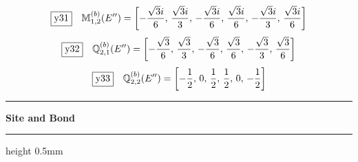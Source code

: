 \documentclass[fleqn,10pt,landscape]{jsarticle}
\begin{document}
\begin{dmath*}
\fbox{y31}\quad \mathbb{M}_{1,2}^{(b)}(E^{\prime\prime})=\left[ - \frac{\sqrt{3} i}{6},\, \frac{\sqrt{3} i}{3},\, - \frac{\sqrt{3} i}{6},\, \frac{\sqrt{3} i}{6},\, - \frac{\sqrt{3} i}{3},\, \frac{\sqrt{3} i}{6} \right]
\end{dmath*}
\begin{dmath*}
\fbox{y32}\quad \mathbb{Q}_{2,1}^{(b)}(E^{\prime\prime})=\left[ - \frac{\sqrt{3}}{6},\, \frac{\sqrt{3}}{3},\, - \frac{\sqrt{3}}{6},\, \frac{\sqrt{3}}{6},\, - \frac{\sqrt{3}}{3},\, \frac{\sqrt{3}}{6} \right]
\end{dmath*}
\begin{dmath*}
\fbox{y33}\quad \mathbb{Q}_{2,2}^{(b)}(E^{\prime\prime})=\left[ - \frac{1}{2},\, 0,\, \frac{1}{2},\, \frac{1}{2},\, 0,\, - \frac{1}{2} \right]
\end{dmath*}
\vspace{5mm}
\noindent \rule[0.5mm]{5mm}{0.5mm}\hspace{3mm}\textbf{Site and Bond}\hspace{3mm}\leaders\hrule height 0.5mm\hfill\kern0pt
\vspace{3mm}
\end{document}
